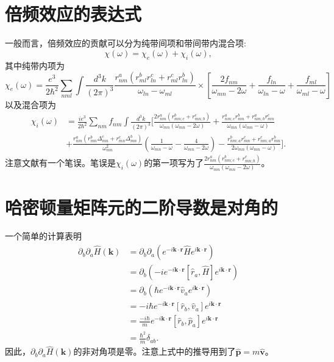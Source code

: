 \begin{appendices}

\chapter{倍频效应的表达式}\label{sec:expression-of-second}

一般而言，倍频效应的贡献可以分为纯带间项和带间带内混合项\cite{rashkeev_efficient_1998}:
\[
\chi(\omega)=\chi_{e}(\omega)+\chi_{i}(\omega),
\]
其中纯带内项为
\[
\chi_{e}(\omega)=\frac{e^{3}}{2\hbar^{2}}\sum_{nml}\int\frac{d^{3}k}{(2\pi)^{3}}\frac{r_{nm}^{a}(r_{ml}^{b}r_{ln}^{c}+r_{ml}^{c}r_{ln}^{b})}{\omega_{ln}-\omega_{ml}}\times[\frac{2f_{nm}}{\omega_{mn}-2\omega}+\frac{f_{ln}}{\omega_{ln}-\omega}+\frac{f_{ml}}{\omega_{ml}-\omega}]
\]
以及混合项为
\begin{align*}
\chi_{i}(\omega) & =\frac{ie^{3}}{2\hbar^{2}}\sum_{nm}f_{nm}\int\frac{d^{3}k}{(2\pi)^{3}}[\frac{2r_{nm}^{a}(r_{mn;c}^{b}+r_{mn;b}^{c})}{\omega_{mn}(\omega_{mn}-2\omega)}+\frac{r_{nm;c}^{a}r_{mn}^{b}+r_{nm;b}^{a}r_{mn}^{c}}{\omega_{mn}(\omega_{mn}-\omega)}\\
    & +\frac{r_{nm}^{a}(r_{mn}^{b}\Delta_{mn}^{c}+r_{mn}^{c}\Delta_{mn}^{b})}{\omega_{mn}^{2}}(\frac{1}{\omega_{mn}-\omega}-\frac{4}{\omega_{mn}-2\omega})-\frac{r_{nm;a}^{b}r_{mn}^{c}+r_{nm;a}^{c}r_{mn}^{b}}{2\omega_{mn}(\omega_{mn}-\omega)}].
\end{align*}
注意文献有一个笔误。笔误是$\chi_{i}(\omega)$的第一项写为了$\frac{2r_{nm}^{a}(r_{nm;c}^{b}+r_{mn;b}^{c})}{\omega_{mn}(\omega_{mn}-2\omega)}$。

\chapter{哈密顿量矩阵元的二阶导数是对角的}\label{sec:Proving-Second-Order}

一个简单的计算表明
\begin{align*}
\partial_{b}\partial_{a}\hat{H}(\mathbf{k}) & =\partial_{b}\partial_{a}(e^{-i\mathbf{k}\cdot\mathbf{r}}\hat{H}e^{i\mathbf{k}\cdot\mathbf{r}})\\
    & =\partial_{b}(-ie^{-i\mathbf{k}\cdot\mathbf{r}}[\hat{r}_{a},\hat{H}]e^{i\mathbf{k}\cdot\mathbf{r}})\\
    & =\partial_{b}(\hbar e^{-i\mathbf{k}\cdot\mathbf{r}}\hat{v}_{a}e^{i\mathbf{k}\cdot\mathbf{r}})\\
    & =-i\hbar e^{-i\mathbf{k}\cdot\mathbf{r}}[\hat{r}_{b},\hat{v}_{a}]e^{i\mathbf{k}\cdot\mathbf{r}}\\
    & =\frac{-i\hbar}{m}e^{-i\mathbf{k}\cdot\mathbf{r}}[\hat{r}_{b},\hat{p}_{a}]e^{i\mathbf{k}\cdot\mathbf{r}}\\
    & =\frac{\hbar^{2}}{m}\delta_{ab}.
\end{align*}
因此，$\partial_{b}\partial_{a}\hat{H}(\mathbf{k})$的非对角项是零。注意上式中的推导用到了$\hat{\mathbf{p}}=m\hat{\mathbf{v}}$。


\end{appendices}
